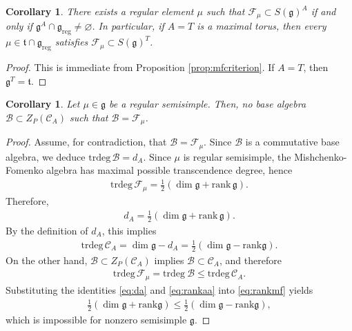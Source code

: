 \documentclass[11pt,reqno]{amsart}
\newtheorem*{theorem A}{Main Theorem A}
\newtheorem*{theorem B}{Main Theorem B}
\newtheorem*{theorem C}{Main Theorem C}
\newtheorem*{theorem D}{Main Theorem D}
\theoremstyle{definition}
\theoremstyle{plain}
\newtheorem{corollary}[theorem]{Corollary}
\theoremstyle{conclusion}
\begin{document}
\begin{corollary}
\label{cor:mfregexi}
There exists a regular element $\mu$ such that $\mathcal{F}_\mu \subset S(\mathfrak{g})^A$ if and only if $\mathfrak{g}^A \cap \mathfrak{g}_{\mathrm{reg}} \ne \varnothing$. In particular, if $A=T$ is a maximal torus, then every $\mu \in \mathfrak{t} \cap \mathfrak{g}_{\mathrm{reg}}$ satisfies $\mathcal{F}_\mu \subset S(\mathfrak{g})^T$. 
\end{corollary}

\begin{proof}
This is immediate from Proposition \ref{prop:mfcriterion}. If $A=T$, then $\mathfrak{g}^T = \mathfrak{t}$.
\end{proof}

\begin{corollary}
    \label{coro:mfnoconb}
Let $\mu \in \mathfrak{g}$ be a regular semisimple. Then, no base algebra $\mathcal{B} \subset Z_P(\mathcal{C}_A)$ such that $\mathcal{B} = \mathcal{F}_\mu$. 
\end{corollary} 

\begin{proof}
Assume, for contradiction, that $\mathcal{B} = \mathcal{F}_\mu$. Since $ \mathcal{B}$ is a commutative base algebra, we deduce  $\mathrm{trdeg} \, \mathcal{B} = d_A$. Since $\mu$ is regular semisimple, the Mishchenko-Fomenko algebra has maximal possible transcendence degree, hence \begin{align*}
\mathrm{trdeg}\, \mathcal{F}_\mu = \frac{1}{2}(\dim \mathfrak{g} + \mathrm{rank} \,\mathfrak{g}).
\end{align*} Therefore, \begin{align}
d_A = \frac{1}{2}(\dim \mathfrak{g} + \mathrm{rank} \,\mathfrak{g}). \label{eq:da}
\end{align} By the definition of $d_A$, this implies \begin{align}
\mathrm{trdeg}\, \mathcal{C}_A = \dim \mathfrak{g} - d_A = \frac{1}{2}(\dim \mathfrak{g} - \mathrm{rank}\mathfrak{g}). \label{eq:rankaa}
\end{align} On the other hand, $\mathcal{B} \subset Z_P(\mathcal{C}_A)$ implies $\mathcal{B} \subset \mathcal{C}_A$, and therefore \begin{align}
\mathrm{trdeg} \, \mathcal{F}_\mu = \mathrm{trdeg} \ \mathcal{B}  \leq \mathrm{trdeg} \, \mathcal{C}_A.\label{eq:rankmf}
\end{align} Substituting the identities \eqref{eq:da} and \eqref{eq:rankaa} into \eqref{eq:rankmf} yields \begin{align*}
\frac{1}{2}(\dim \mathfrak{g} + \mathrm{rank}\mathfrak{g}) \leq \frac{1}{2}(\dim \mathfrak{g} - \mathrm{rank}\mathfrak{g}),
\end{align*} which is impossible for nonzero semisimple $\mathfrak{g}$.
\end{proof}
\end{document}
